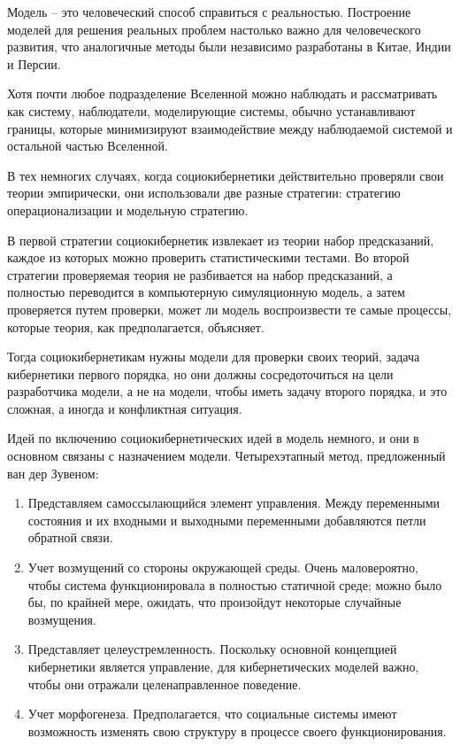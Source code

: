\documentclass[a4page]{article}
\begin{document}
Модель – это человеческий способ справиться с реальностью. Построение моделей для решения реальных проблем настолько важно для человеческого развития, что аналогичные методы были независимо разработаны в Китае, Индии и Персии.

Хотя почти любое подразделение Вселенной можно наблюдать и рассматривать как систему, наблюдатели, моделирующие системы, обычно устанавливают границы, которые минимизируют взаимодействие между наблюдаемой системой и остальной частью Вселенной.

В тех немногих случаях, когда социокибернетики действительно проверяли свои теории эмпирически, они использовали две разные стратегии\cite{validation_of_sociocybernetic_models}: стратегию операционализации и модельную стратегию.

В первой стратегии социокибернетик извлекает из теории набор предсказаний, каждое из которых можно проверить статистическими тестами. Во второй стратегии проверяемая теория не разбивается на набор предсказаний, а полностью переводится в компьютерную симуляционную модель, а затем проверяется путем проверки, может ли модель воспроизвести те самые процессы, которые теория, как предполагается, объясняет.

Тогда социокибернетикам нужны модели для проверки своих теорий, задача кибернетики первого порядка, но они должны сосредоточиться на цели разработчика модели, а не на модели, чтобы иметь задачу второго порядка, и это сложная, а иногда и конфликтная ситуация.

Идей по включению социокибернетических идей в модель немного, и они в основном связаны с назначением модели. Четырехэтапный метод, предложенный ван дер Зувеном\cite{validation_of_sociocybernetic_models}:

\begin{enumerate}
  \item Представляем самоссылающийся элемент управления. Между переменными состояния и их входными и выходными переменными добавляются петли обратной связи.
   \item Учет возмущений со стороны окружающей среды. Очень маловероятно, чтобы система функционировала в полностью статичной среде; можно было бы, по крайней мере, ожидать, что произойдут некоторые случайные возмущения.
   \item Представляет целеустремленность. Поскольку основной концепцией кибернетики является управление, для кибернетических моделей важно, чтобы они отражали целенаправленное поведение.
   \item Учет морфогенеза. Предполагается, что социальные системы имеют возможность изменять свою структуру в процессе своего функционирования.
 \end{enumerate}
\end{document}
